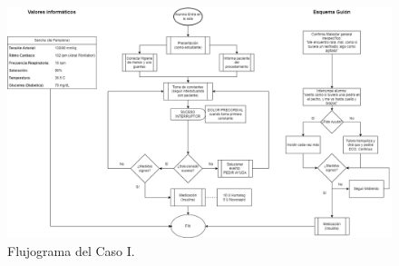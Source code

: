     \begin{figure}[H]
        \centering
    	\includegraphics[width=\textwidth]{./imagenes/ACV-AdSC-CasoIDiagramaFlujoIIEnf.png}
    	\caption{\label{fig:PlanXVII:CasoI}Flujograma del Caso I.}
    \end{figure}
\clearpage
